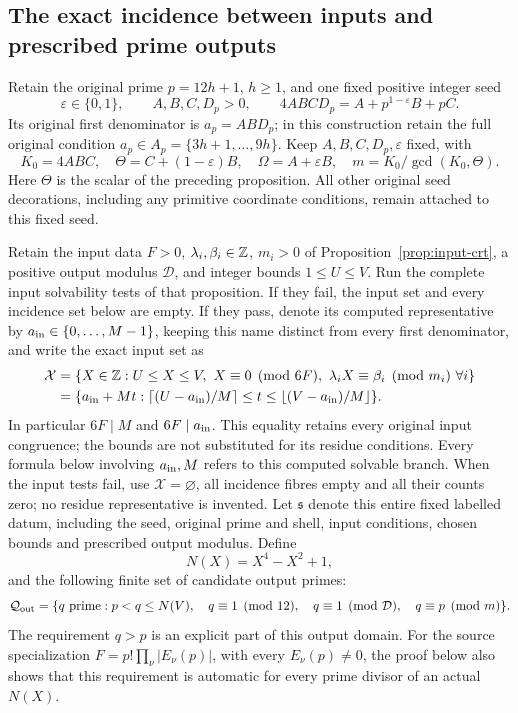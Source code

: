 \subsection{The exact incidence between inputs and prescribed prime outputs}

Retain the original prime \(p=12h+1\), \(h\ge1\), and one fixed
positive integer seed
\[
 \varepsilon\in\{0,1\},\qquad A,B,C,D_p>0,\qquad
 4ABCD_p=A+p^{1-\varepsilon}B+pC.
\]
Its original first denominator is \(a_p=ABD_p\); in this
construction retain the full original condition
\(a_p\in A_p=\{3h+1,\ldots,9h\}\).
Keep \(A,B,C,D_p,\varepsilon\) fixed, with
\[
 K_0=4ABC,\quad \Theta=C+(1-\varepsilon)B,\quad
 \Omega=A+\varepsilon B,\quad
 m=K_0/\gcd(K_0,\Theta).
\]
Here \(\Theta\) is the scalar of the preceding proposition.
All other original seed decorations, including any primitive
coordinate conditions, remain attached to this fixed seed.

Retain the input data \(F>0\), \(\lambda_i,\beta_i\in\mathbb Z\),
\(m_i>0\) of Proposition~\ref{prop:input-crt}, a positive output
modulus \(\mathcal D\), and integer bounds \(1\le U\le V\).
Run the complete input solvability tests of that proposition.
If they fail, the input set and every incidence set below are empty.
If they pass, denote its computed representative by
\(a_{\rm in}\in\{0,\ldots,M-1\}\), keeping this name distinct
from every first denominator, and write the exact input set as
\begin{align*}
 \mathcal X
 &=\{X\in\mathbb Z:U\le X\le V,\ X\equiv0\pmod{6F},\
                  \lambda_iX\equiv\beta_i\pmod{m_i}\ \forall i\}\\
 &=\{a_{\rm in}+Mt:
       \lceil(U-a_{\rm in})/M\rceil\le t\le
       \lfloor(V-a_{\rm in})/M\rfloor\}.
\end{align*}
In particular \(6F\mid M\) and \(6F\mid a_{\rm in}\).
This equality retains every original input congruence; the bounds
are not substituted for its residue conditions.
Every formula below involving \(a_{\rm in},M\) refers to this
computed solvable branch.  When the input tests fail, use
\(\mathcal X=\varnothing\), all incidence fibres empty and all
their counts zero; no residue representative is invented.
Let \(\mathfrak s\) denote this entire fixed labelled datum,
including the seed, original prime and shell, input conditions,
chosen bounds and prescribed output modulus.  Define
\[
 N(X)=X^4-X^2+1,
\]
and the following finite set of candidate output primes:
\[
 \mathcal Q_{\rm out}=
 \{q\text{ prime}:p<q\le N(V),\quad
       q\equiv1\pmod{12},\quad q\equiv1\pmod{\mathcal D},\quad
       q\equiv p\pmod m\}.
\]
The requirement \(q>p\) is an explicit part of this output domain.
For the source specialization
\(F=p!\prod_\nu|E_\nu(p)|\), with every \(E_\nu(p)\ne0\),
the proof below also shows that this requirement is automatic
for every prime divisor of an actual \(N(X)\).

